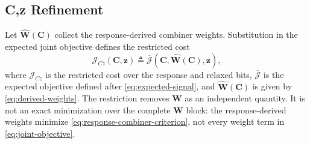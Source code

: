 \documentclass[conference]{IEEEtran}
\begin{document}
\subsection{C,z Refinement}

Let \(\widehat{\mathbf W}(\mathbf C)\) collect the response-derived combiner
weights.  Substitution in the expected joint objective defines the restricted
cost
\begin{equation}
  \mathcal J_{Cz}(\mathbf C,\mathbf z)
  \triangleq
  \overline{\mathcal J}
  \left(\mathbf C,\widehat{\mathbf W}(\mathbf C),\mathbf z\right),
  \label{eq:cz-restriction}
\end{equation}
where \(\mathcal J_{Cz}\) is the restricted cost over the response and relaxed
bits, \(\overline{\mathcal J}\) is the expected objective defined after
\eqref{eq:expected-signal}, and \(\widehat{\mathbf W}(\mathbf C)\) is given by
\eqref{eq:derived-weights}.  The restriction removes \(\mathbf W\) as an
independent quantity.  It is not an exact minimization over the complete
\(\mathbf W\) block: the response-derived weights minimize
\eqref{eq:response-combiner-criterion}, not every weight term in
\eqref{eq:joint-objective}.
\end{document}
